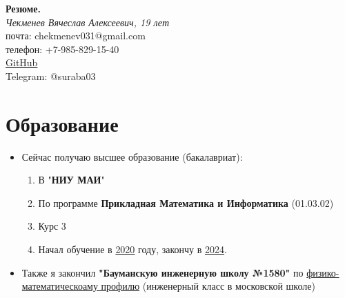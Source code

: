 \documentclass[a4paper,12pt]{article}
\date{}
\begin{document}
\begin{titlepage}
   \begin{center}
      \Large\textbf{Резюме.}\\
      \large\textit{ Чекменев Вячеслав Алексеевич, 19 лет}\\
      \large почта: chekmenev031@gmail.com \\
      \large телефон: +7-985-829-15-40 \\
      \large \href{https://github.com/Suraba03}{GitHub} \\
      \large Telegram: @suraba03\\
   \end{center}
\end{titlepage}

\section{Образование}
\begin{itemize}
    \item Сейчас получаю высшее образование (бакалавриат):
        \begin{enumerate}
            \item В "\textbf{НИУ МАИ}"
            \item По программе \textbf{Прикладная Математика и Информатика} (01.03.02)
            \item Курс 3
            \item Начал обучение в \underline{2020} году, закончу в \underline{2024}.
        \end{enumerate} 
    \item Также я закончил \textbf{"Бауманскую инженерную школу №1580"} по \underline{физико-математическоаму профилю} (инженерный класс в московской школе)
\end{itemize}
\end{document}
